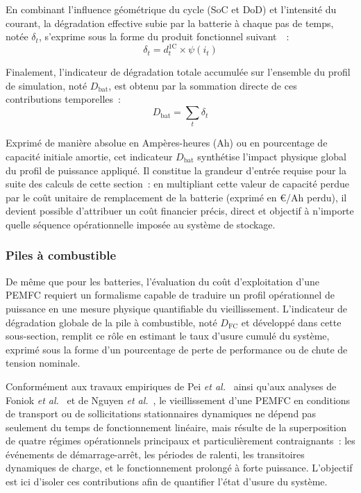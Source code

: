 En combinant l'influence géométrique du cycle (SoC et DoD) et l'intensité du courant, la dégradation effective subie par la batterie à chaque pas de temps, notée $\delta_t$, s'exprime sous la forme du produit fonctionnel suivant~\cite{maheshwari_optimizing_2020}~:
\begin{equation}
    \delta_t = d_t^{1\text{C}} \times \psi(i_t)
    \label{eq:effective_degradation_step}
\end{equation}

Finalement, l'indicateur de dégradation totale accumulée sur l'ensemble du profil de simulation, noté $D_{\text{bat}}$, est obtenu par la sommation directe de ces contributions temporelles~:
\begin{equation}
    D_{\text{bat}} = \sum_t \delta_t
    \label{eq:total_degradation}
\end{equation}

Exprimé de manière absolue en Ampères-heures (Ah) ou en pourcentage de capacité initiale amortie, cet indicateur $D_{\text{bat}}$ synthétise l'impact physique global du profil de puissance appliqué. Il constitue la grandeur d'entrée requise pour la suite des calculs de cette section~: en multipliant cette valeur de capacité perdue par le coût unitaire de remplacement de la batterie (exprimé en €/Ah perdu), il devient possible d'attribuer un coût financier précis, direct et objectif à n'importe quelle séquence opérationnelle imposée au système de stockage.

\subsubsection{Piles à combustible}

De même que pour les batteries, l'évaluation du coût d'exploitation d'une PEMFC requiert un formalisme capable de traduire un profil opérationnel de puissance en une mesure physique quantifiable du vieillissement. L'indicateur de dégradation globale de la pile à combustible, noté $D_{\text{FC}}$ et développé dans cette sous-section, remplit ce rôle en estimant le taux d'usure cumulé du système, exprimé sous la forme d'un pourcentage de perte de performance ou de chute de tension nominale.

Conformément aux travaux empiriques de Pei \textit{et al.}~\cite{pei_quick_2008} ainsi qu'aux analyses de Foniok \textit{et al.}~\cite{foniok_mechanisms_2025} et de Nguyen \textit{et al.}~\cite{nguyen_comprehensive_2023}, le vieillissement d'une PEMFC en conditions de transport ou de sollicitations stationnaires dynamiques ne dépend pas seulement du temps de fonctionnement linéaire, mais résulte de la superposition de quatre régimes opérationnels principaux et particulièrement contraignants~: les événements de démarrage-arrêt, les périodes de ralenti, les transitoires dynamiques de charge, et le fonctionnement prolongé à forte puissance. L'objectif est ici d'isoler ces contributions afin de quantifier l'état d'usure du système.

